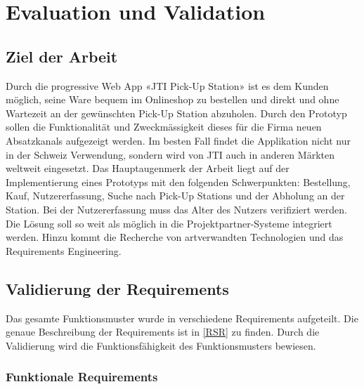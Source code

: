 \section{Evaluation und Validation}\label{Evaluation}
\subsection{Ziel der Arbeit}
Durch die progressive Web App «JTI Pick-Up Station» ist es dem Kunden möglich, seine Ware bequem im Onlineshop zu bestellen und direkt und ohne Wartezeit an der gewünschten Pick-Up Station abzuholen. Durch den Prototyp sollen die Funktionalität und Zweckmässigkeit dieses für die Firma neuen Absatzkanals aufgezeigt werden. Im besten Fall findet die Applikation nicht nur in der Schweiz Verwendung, sondern wird von JTI auch in anderen Märkten weltweit eingesetzt. Das Hauptaugenmerk der Arbeit liegt auf der Implementierung eines Prototyps mit den folgenden Schwerpunkten: Bestellung, Kauf, Nutzererfassung, Suche nach Pick-Up Stations und der Abholung an der Station. Bei der Nutzererfassung muss das Alter des Nutzers verifiziert werden. Die Lösung soll so weit als möglich in die Projektpartner-Systeme integriert werden. Hinzu kommt die Recherche von artverwandten Technologien und das Requirements Engineering. 

\subsection{Validierung der Requirements}
Das gesamte Funktionsmuster wurde in verschiedene Requirements aufgeteilt. Die genaue Beschreibung der Requirements ist in \ref{RSR} zu finden. Durch die Validierung wird die Funktionsfähigkeit des Funktionsmusters bewiesen. 
\subsubsection{Funktionale Requirements}
